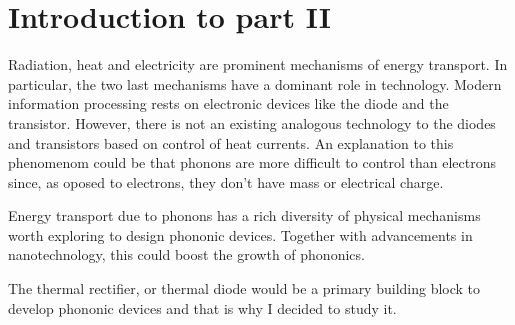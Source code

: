 \section*{Introduction to part II}

Radiation, heat and electricity are prominent mechanisms of energy transport. In particular, the two last mechanisms have a dominant role in technology. Modern information processing rests on electronic devices like the diode and the transistor. However, there is not an existing analogous technology to the diodes and transistors based on control of heat currents. An explanation to this phenomenom could be that phonons are more difficult to control than electrons since, as oposed to electrons, they don't have mass or electrical charge.

Energy transport due to phonons has a rich diversity of physical mechanisms worth exploring to design phononic devices. Together with advancements in nanotechnology, this could boost the growth of phononics.

The thermal rectifier, or thermal diode would be a primary building block to develop phononic devices and that is why I decided to study it.
